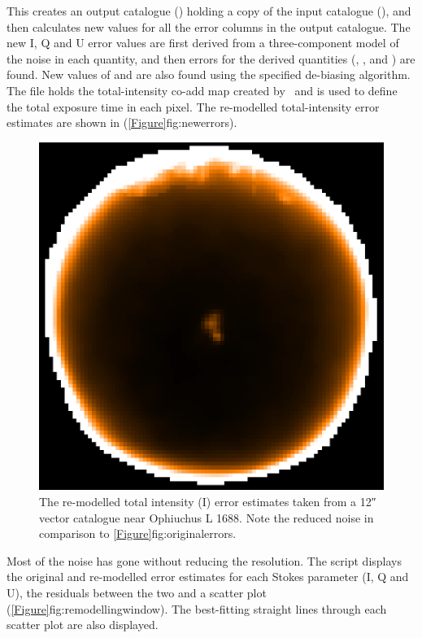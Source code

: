 \begin{terminalv}
\end{terminalv}

This  creates an output catalogue () holding a copy of the input catalogue (), and then calculates new values for all the error columns in the output catalogue. The new I, Q and U error values are first derived from a three-component model of the noise in each quantity, and then errors for the derived quantities (, , and ) are found. New values of  and  are also found using the specified de-biasing algorithm. The file  holds the total-intensity co-add map created by \poltwomap\ and is used to define the total exposure time in each pixel. The re-modelled total-intensity error estimates are shown in (\cref{Figure}{fig:newerrors}{}).

\begin{figure}[ht!]
\begin{center}
\includegraphics[width=0.46\linewidth]{sc22-ophl1688-pol2-noise-remod-1.png}
\caption [Remodelled Error Estimates in POL-2 Vector Catalogue for Oph L1688]{
  The re-modelled total intensity (I) error estimates taken from a 12\si{\arcsecond} vector catalogue near Ophiuchus L 1688. Note the reduced noise in comparison to \cref{Figure}{fig:originalerrors}{}.
\label{fig:newerrors}
}
\end{center}
\end{figure}

Most of the noise has gone without reducing the resolution. The script displays the original and re-modelled error estimates for each Stokes parameter (I, Q and U), the residuals between the two and a scatter plot (\cref{Figure}{fig:remodellingwindow}{}). The best-fitting straight lines through each scatter plot are also displayed.

